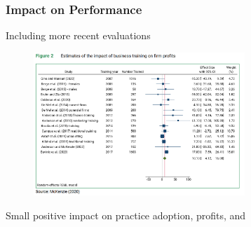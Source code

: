 \documentclass[hideothersubsections, usenames,dvipsnames,11pt]{beamer}
\newenvironment{itemize_2pt}{\itemize\addtolength{\itemsep}{2pt}}{\enditemize}
\begin{document}
\begin{frame}[label=McK2020_profits]
\frametitle{Impact on Performance}
	
	Including more recent evaluations \citep[see,][]{McKenzie2020}
	
\vspace{-0.5em}	
	
	\begin{figure}[htbp]
		\centering
		\includegraphics[width=21.5em]{pics/McK2020_profits.png}
		\label{McKenzie(2020): Profits}
	\end{figure}	
	
	\vspace{-1em}	
	
	\begin{itemize_2pt}
		\item Small positive impact on practice adoption, profits, and \hyperlink{McK2020_sales}{}
	\end{itemize_2pt}
	
	
\end{frame}
\end{document}
